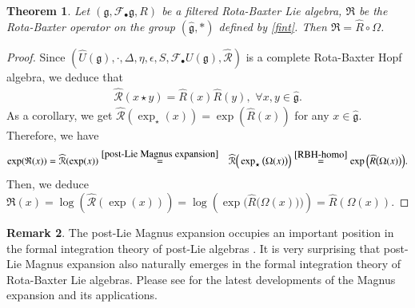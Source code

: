 \documentclass[12pt]{amsart}
\newtheorem{thm}{Theorem}[section]
\theoremstyle{definition}   %
\newtheorem{rmk}[thm]{Remark}
\newcommand{\g}{\mathfrak g}
\newcommand{\huaR}{\mathcal{R}}
\newcommand{\huaF}{\mathcal{F}}
\newcommand{\frkR}{\mathfrak R}
\begin{document}
\begin{thm}\label{thm:formula}
Let $(\g, \huaF_{\bullet}\g, R)$ be a filtered Rota-Baxter Lie algebra, $\frkR$ be the Rota-Baxter operator on  the group $(\widehat {\g},*)$ defined by \eqref{fint}.  Then $\frkR=\widehat{R}\circ \Omega$.
\end{thm}


\begin{proof}

Since $(\widehat{U}(\g),\cdot,\Delta, \eta, \epsilon, S,\huaF_{\bullet}U(\g),\widehat{\huaR})$ is a  complete Rota-Baxter Hopf algebra, we deduce that
\begin{eqnarray}\label{RBH-homo}
\widehat{\huaR}(x\star y)=\widehat{R}(x)\widehat{R}(y),\,\,\forall x,y\in \widehat{\g}.
\end{eqnarray}
As a corollary, we get  $\widehat{\huaR}(\exp_{\star}(x))=\exp(\widehat{R}(x))$ for any $x\in \widehat{\g}$. Therefore, we have
\begin{eqnarray*}
\exp(\frkR(x))=\widehat{\huaR}(\exp(x))&\stackrel{\eqref{post-Lie Magnus expansion}}{=}&\widehat{\huaR}\Big(\exp_\star \big(\Omega(x)\big)\Big)\stackrel{\eqref{RBH-homo}}{=} \exp\Big(\widehat{R}\big(\Omega(x)\big)\Big).
\end{eqnarray*}
Then, we deduce
$
\frkR(x)=\log(\widehat{\huaR}(\exp(x)))=\log\left(\exp\Big(\widehat{R}\big(\Omega(x)\big)\Big)\right)=\widehat{R}\left(\Omega(x)\right).
$
\end{proof}







\begin{rmk}
The post-Lie Magnus expansion  occupies  an important position in the  formal integration theory of post-Lie algebras \cite[Theorem 5.22]{BGST}.
It is very surprising that post-Lie Magnus expansion also naturally emerges in  the formal integration theory of Rota-Baxter Lie algebras. Please see \cite{EMQ} for the latest developments of the Magnus expansion and its applications.
\end{rmk}
\end{document}
